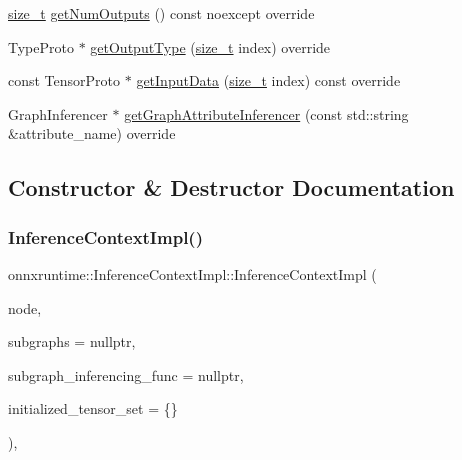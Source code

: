 \begin{DoxyCompactItemize}
\item 
\mbox{\hyperlink{mlasi_8h_a503efbc1c6e50825320ad909366b78ab}{size\+\_\+t}} \mbox{\hyperlink{classonnxruntime_1_1InferenceContextImpl_ab596294613aa17dac5621de5662dccb3}{get\+Num\+Outputs}} () const noexcept override
\item 
Type\+Proto $\ast$ \mbox{\hyperlink{classonnxruntime_1_1InferenceContextImpl_aed6ee0c15da7b2a1ceac5e6ee2186905}{get\+Output\+Type}} (\mbox{\hyperlink{mlasi_8h_a503efbc1c6e50825320ad909366b78ab}{size\+\_\+t}} index) override
\item 
const Tensor\+Proto $\ast$ \mbox{\hyperlink{classonnxruntime_1_1InferenceContextImpl_a47871d7eadd0e3d5bf9b347c933e9ea6}{get\+Input\+Data}} (\mbox{\hyperlink{mlasi_8h_a503efbc1c6e50825320ad909366b78ab}{size\+\_\+t}} index) const override
\item 
Graph\+Inferencer $\ast$ \mbox{\hyperlink{classonnxruntime_1_1InferenceContextImpl_ad3a8cd7b05d6d7ea7ccf957aafcebb50}{get\+Graph\+Attribute\+Inferencer}} (const std\+::string \&attribute\+\_\+name) override
\end{DoxyCompactItemize}


\subsection{Constructor \& Destructor Documentation}
\mbox{\label{classonnxruntime_1_1InferenceContextImpl_a20ba0c93f6fcb52e31f4dfbbb4f3da28}} 
\subsubsection{\texorpdfstring{Inference\+Context\+Impl()}{InferenceContextImpl()}}
{\footnotesize\ttfamily onnxruntime\+::\+Inference\+Context\+Impl\+::\+Inference\+Context\+Impl (\begin{DoxyParamCaption}\item[{\mbox{\hyperlink{classonnxruntime_1_1Node}{Node}} \&}]{node,  }\item[{const Attribute\+Graph\+Map $\ast$}]{subgraphs = {\ttfamily nullptr},  }\item[{\mbox{\hyperlink{namespaceonnxruntime_ae184f68a858158d9595f3fe260b05dfb}{Subgraph\+Inferencing\+Func}} $\ast$}]{subgraph\+\_\+inferencing\+\_\+func = {\ttfamily nullptr},  }\item[{const \mbox{\hyperlink{namespaceonnxruntime_a80c06ce917adca79f4a9c0f9ad3147f8}{Initialized\+Tensor\+Set}} \&}]{initialized\+\_\+tensor\+\_\+set = {\ttfamily \{\}} }\end{DoxyParamCaption})\hspace{0.3cm}{\ttfamily [inline]}, {\ttfamily [noexcept]}}




